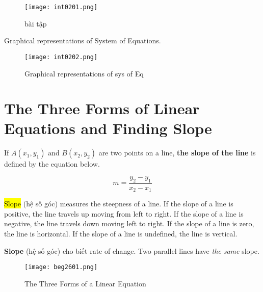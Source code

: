 \begin{figure}[htb!]
  \centering
  \texttt{[image: int0201.png]}
  \caption{bài tập}
\end{figure}

Graphical representations of System of Equations.

\begin{figure}[htb!]
  \centering
  \texttt{[image: int0202.png]}
  \caption{Graphical representations of sys of Eq}
\end{figure}

\newpage

\section{The Three Forms of Linear Equations and Finding Slope}




If \(A(x_{1},y_{1})\text{ and } B(x_{2},y_{2})\) are two points on a line, \textbf{the slope of the line} is defined by the equation below.

\begin{equation}
  m = \frac{y_{2}-y_{1}}{x_{2}-x_{1}}
  \label{eq:3.1}
\end{equation}

\hl{Slope} (hệ số góc) measures the steepness of a line. If the slope of a line is positive, the line travels up moving from left to right. If the slope of a line is negative, the line travels down moving left to right. If the slope of a line is zero, the line is horizontal. If the slope of a line is undefined, the line is vertical.

\textbf{Slope} (hệ số góc) cho biết rate of change. Two parallel lines have \textit{the same} slope.


\begin{figure}[htb!]
  \centering
  \texttt{[image: beg2601.png]}
  \caption{The Three Forms of a Linear Equation}
\end{figure}



